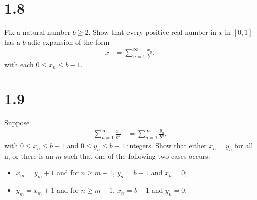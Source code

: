 \documentclass[10pt]{mypackage}
\begin{document}
\RaggedRight
\section{1.8}%
\begin{problem}
  Fix a natural number $b\geq 2$. Show that every positive real number in $x$ in $[0,1]$ has a $b$-adic expansion of the form
  \begin{align*}
    x &= \sum_{n=1}^{\infty}\frac{x_n}{b^n},
  \end{align*}
  with each $0\leq x_n \leq b-1$.
\end{problem}
\section{1.9}%
\begin{problem}
  Suppose
  \begin{align*}
    \sum_{n=1}^{\infty}\frac{x_n}{b^n} &= \sum_{n=1}^{\infty}\frac{y_n}{b^n},
  \end{align*}
  with $0 \leq x_n \leq b-1$ and $0 \leq y_n \leq b-1$ integers. Show that either $x_n = y_n$ for all n, or there is an $m$ such that one of the following two cases occurs:
  \begin{itemize}
    \item $x_m = y_m + 1$ and for $n\geq m+1$, $y_n = b-1$ and $ x_n = 0$;
    \item $y_m = x_m + 1$ and for $n\geq m+1$, $x_n = b-1$ and $y_n = 0$.
  \end{itemize}
\end{problem}
\end{document}
